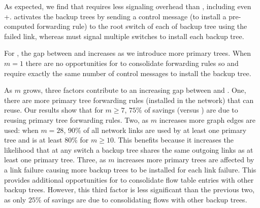 As expected, we find that \pre requires less signaling overhead than \posts, including even \posts+\lbs.   \pre activates the backup trees by sending a control message
(to install a pre-computed forwarding rule) to the root switch of each of backup tree using the failed link, whereas \post must signal multiple switches to install each 
backup tree. %


For \posts, the gap between \base and \merge increases as we introduce more primary trees.  
When $m=1$ there are no opportunities for \merge to consolidate forwarding rules so \merge and \base require exactly 
the same number of control messages to install the backup tree.

As $m$ grows, three factors contribute to an increasing gap between \base and \merges.  One, there are more primary tree forwarding rules 
(installed in the network) that \merge can reuse. Our results show that for $m \geq 7$, $75\%$ of \merge savings (versus \bases) are due to reusing primary tree forwarding rules. Two, 
as $m$ increases more graph edges are used: when $m=28$, $90\%$ of all network links are used by at least one primary tree and is at least $80\%$ for $m \geq10$. 
This benefits \merge because it increases the likelihood that at any switch a backup tree shares the same outgoing links as at least one primary tree. 
Three, as $m$ increases more primary trees are affected by a link failure causing more backup trees to be installed for each link failure. 
This provides additional opportunities for \merge to consolidate flow table entries with other backup trees.
However, this third factor is less significant than the previous two, as only $25\%$ of \merge savings are due to consolidating flows with other backup trees.

